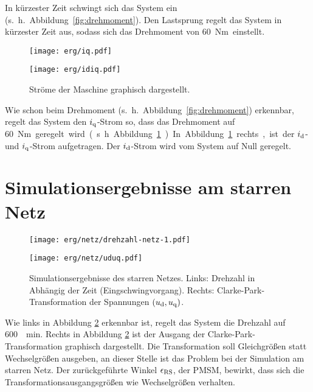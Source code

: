 In kürzester Zeit schwingt sich das System ein (s.~h.~Abbildung~\ref{fig:drehmoment}).
Den Lastsprung regelt das System in kürzester Zeit aus, sodass sich das Drehmoment von \SI{60}Nm einstellt.

\begin{figure}[h!]
	\begin{minipage}[t]{0.5\textwidth}
		\texttt{[image: erg/iq.pdf]}
	\end{minipage}
	\begin{minipage}[t]{0.5\textwidth} 
		\texttt{[image: erg/idiq.pdf]}
	\end{minipage}
		\caption{Ströme der Maschine graphisch dargestellt.}
		\label{fig:idiq-strom}
	\end{figure}

Wie schon beim Drehmoment (s.~h.~Abbildung~\ref{fig:drehmoment}) erkennbar, regelt das System den $i_{\mathrm{q}}$-Strom so, dass das Drehmoment auf \SI{60}Nm geregelt wird (s.~h.~Abbildung~\ref{fig:idiq-strom}).
In Abbildung \ref{fig:idiq-strom} rechts, ist der $i_{\mathrm{d}}$- und $i_{\mathrm{q}}$-Strom aufgetragen.
Der $i_{\mathrm{d}}$-Strom wird vom System auf Null geregelt.

\newpage

\section{Simulationsergebnisse am starren Netz}\label{sec:sim-starr-netz}

\begin{figure}[h!]
	\begin{minipage}[t]{0.5\textwidth}
		\texttt{[image: erg/netz/drehzahl-netz-1.pdf]}
	\end{minipage}
	\begin{minipage}[t]{0.5\textwidth} 
		\texttt{[image: erg/netz/uduq.pdf]}
	\end{minipage}
	\caption{Simulationsergebnisse des starren Netzes. Links: Drehzahl in Abhängig der Zeit (Eingschwingvorgang). Rechts: Clarke-Park-Transformation der Spannungen $(u_{\mathrm{d}}, u_{\mathrm{q}})$.}
	\label{fig:n-netz}
\end{figure}

Wie links in Abbildung \ref{fig:n-netz} erkennbar ist, regelt das System die Drehzahl auf \SI{600}{\per\minute}.
Rechts in Abbildung \ref{fig:n-netz} ist der Ausgang der Clarke-Park-Transformation graphisch dargestellt.
Die Transformation soll Gleichgrößen statt Wechselgrößen ausgeben, an dieser Stelle ist das Problem bei der Simulation am starren Netz.
Der zurückgeführte Winkel $\epsilon_{\mathrm{RS}}$, der PMSM, bewirkt, dass sich die Transformationsausgangsgrößen wie Wechselgrößen verhalten.


